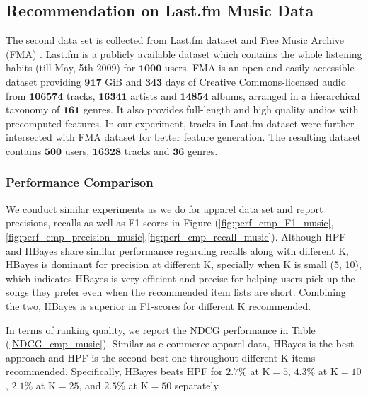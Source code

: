 \subsection{Recommendation on Last.fm Music Data}
The second data set is collected from Last.fm dataset \cite{Celma:Springer2010} and Free Music Archive (FMA) \cite{FMA}. Last.fm is a publicly available dataset which contains the whole listening habits (till May, 5th 2009) for $\mathbf{1000}$ users. FMA is an open and easily accessible dataset providing $\mathbf{917}$ GiB and $\mathbf{343}$ days of Creative Commons-licensed audio from $\mathbf{106574}$ tracks, $\mathbf{16341}$ artists and $\mathbf{14854}$ albums, arranged in a hierarchical taxonomy of $\mathbf{161}$ genres. It also provides full-length and high quality audios with precomputed features.  In our experiment, tracks in Last.fm dataset were further intersected with FMA dataset for better feature generation.  The resulting dataset contains $\mathbf{500}$ users, $\mathbf{16328}$ tracks and $\mathbf{36}$ genres.

\subsubsection{Performance Comparison}
We conduct similar experiments as we do for apparel data set and report precisions, recalls as well as F1-scores in Figure (\ref{fig:perf_cmp_F1_music},\ref{fig:perf_cmp_precision_music},\ref{fig:perf_cmp_recall_music}).  Although HPF and HBayes share similar performance regarding recalls along with different K, HBayes is dominant for precision at different K, specially when K is small (5, 10), which indicates HBayes is very efficient and precise for helping users pick up the songs they prefer even when the recommended item lists are short.   Combining the two, HBayes is superior in F1-scores for different K recommended.  

In terms of ranking quality, we report the NDCG performance in Table (\ref{NDCG_cmp_music}).  Similar as e-commerce apparel data, HBayes is the best approach and HPF is the second best one throughout different K items recommended.  Specifically, HBayes beats HPF for $2.7\%$ at $\text{K}=5$, $4.3\%$ at $\text{K}=10$, $2.1\%$ at $\text{K}=25$, and $2.5\%$ at $\text{K}=50$ separately.

